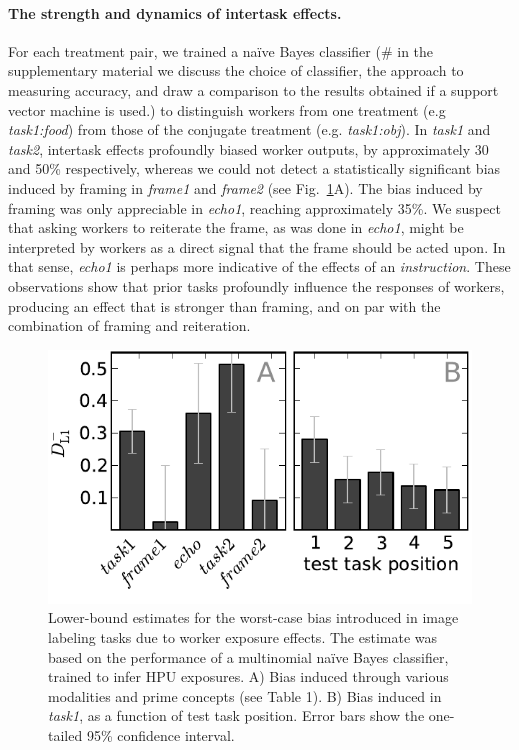 \documentclass[12pt]{article}
\begin{document}
\paragraph{The strength and dynamics of intertask effects.}
For each treatment pair, we trained a na\"ive Bayes classifier (\# in the 
supplementary material we discuss the choice of classifier, the
approach to measuring accuracy, and draw a comparison to the results obtained 
if a support vector machine is used.) to distinguish workers from one 
treatment (e.g \textit{task1:food}) from those of the conjugate treatment 
(e.g. \textit{task1:obj}).  In \textit{task1} and \textit{task2}, intertask 
effects profoundly biased worker outputs, by approximately 30 and 50\% 
respectively, whereas we could not detect 
a statistically significant bias induced by framing in \textit{frame1} and 
\textit{frame2} (see Fig.~\ref{fig:theta}A).  The bias induced
by framing was only appreciable in \textit{echo1}, reaching approximately 
35\%.  
We suspect that asking workers to reiterate the
frame, as was done in \textit{echo1}, might be interpreted by workers as
a direct signal that the frame should be acted upon.  In that sense, 
\textit{echo1} is perhaps more indicative of the effects of an 
\textit{instruction}.  These observations show that
prior tasks profoundly influence the responses of workers, producing an
effect that is stronger than framing, and on par with the combination of 
framing and reiteration.

\begin{figure}
	\centering
	\includegraphics[scale=1]{figs/theta.pdf}
	\caption{
		Lower-bound estimates for the  worst-case bias introduced in image
		labeling tasks due to worker exposure effects.  The estimate was 
		based on the performance of a multinomial na\"ive Bayes classifier,
		trained to infer HPU exposures. A) Bias induced through various
		modalities and prime concepts (see Table 1). B) Bias induced in 
		\textit{task1}, as a function of test task position.  Error bars
		show the one-tailed 95\% confidence interval.
	}
	\label{fig:theta}
\end{figure}
\end{document}
